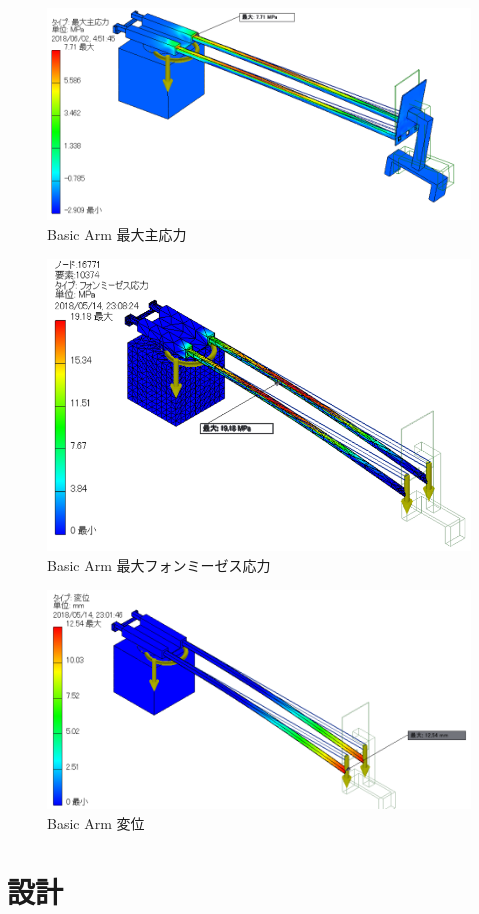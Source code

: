 \documentclass[10pt,b5paper,papersize,dvipdfmx]{jsbook}
\begin{document}
\begin{figure}[htbp]
  \centering
  \includegraphics[width=.7\textwidth]{img/robot10.png}
  \caption{Basic Arm 最大主応力}
  \label{fig:Basic Arm 最大主応力}
\end{figure}
\begin{figure}[htbp]
  \centering
  \includegraphics[width=.7\textwidth]{img/robot11.png}
  \caption{Basic Arm 最大フォンミーゼス応力}
  \label{fig:Basic Arm 最大フォンミーゼス応力}
\end{figure}
\begin{figure}[htbp]
  \centering
  \includegraphics[width=.7\textwidth]{img/robot12.png}
  \caption{Basic Arm 変位}
  \label{fig:Basic Arm 変位}
\end{figure}

\clearpage
\section{設計}
\end{document}
